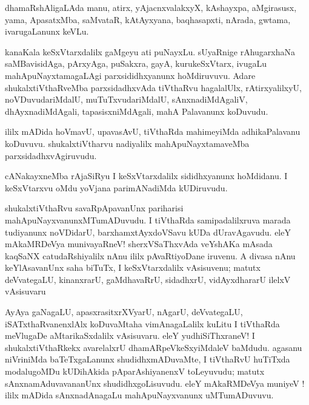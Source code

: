 \documentclass{article}
\begin{document}
\begin{mn}
dhamaRshAligaLAda manu, atirx, yAjacnxvalakxyX, kAshayxpa, aMgirasusx, yama, ApasatxMba, saMvataR,
kAtAyxyana, baqhasapxti, nArada, gwtama, ivarugaLanunx keVLu.
\end{mn}

\begin{mn}
kanaKala keSxVtarxdalilx gaMgeyu ati puNayxLu. sUyaRnige rAhugarxhaNa saMBavisidAga, pArxyAga, 
puSakxra, gayA, kurukeSxVtarx, ivugaLu mahApuNayxtamagaLAgi parxsididhxyanunx hoMdiruvuvu. Adare 
shukalxtiVthaRveMba parxsidadhxvAda tiVthaRvu hagalalUlx, rAtirxyalilxyU, noVDuvudariMdalU, 
muTuTxvudariMdalU, sAnxnadiMdAgaliV, dhAyxnadiMdAgali, tapasisxniMdAgali, mahA Palavanunx koDuvudu.
\end{mn}

\begin{mn}
ililx mADida hoVmavU, upavasAvU, tiVthaRda mahimeyiMda adhikaPalavanu koDuvuvu. shukalxtiVtharvu 
nadiyalilx mahApuNayxtamaveMba parxsidadhxvAgiruvudu.
\end{mn}

\begin{mn}
cANakayxneMba rAjaSiRyu I keSxVtarxdalilx sididhxyanunx hoMdidanu. I keSxVtarxvu oMdu yoVjana 
parimANadiMda kUDiruvudu.
\end{mn}

\begin{mn}
shukalxtiVthaRvu savaRpApavanUnx pariharisi mahApuNayxvanunxMTumADuvudu. I tiVthaRda 
samipadalilxruva marada tudiyanunx noVDidarU, barxhamxtAyxdoVSavu kUDa dUravAgavudu. 
eleY mAkaMRDeVya munivayaRneV! sherxVSaThxvAda veYshAKa mAsada kaqSaNX catudaRshiyalilx nAnu 
ililx pAvaRtiyoDane iruvenu. A divasa nAnu keYlAsavanUnx saha biTuTx, I keSxVtarxdalilx 
vAsisuvenu; matutx deVvategaLU, kinanxrarU, gaMdhavaRrU, sidadhxrU, vidAyxdhararU ilelxV vAsisuvaru
\end{mn}

\begin{mn}
AyAya gaNagaLU, apasxrasitxrXVyarU, nAgarU, deVvategaLU, iSATxthaRvanenxlAlx koDuvaMtaha 
vimAnagaLalilx kuLitu I tiVthaRda meVlugaDe aMtarikaSxdalilx vAsisuvaru. eleY yudhiSiThxraneV! 
I shukalxtiVthaRkekx avarelalxrU dhamARpeVkeSxyiMdaleV baMdudu. agasanu niVriniMda baTeTxgaLanunx 
shudidhxmADuvaMte, I tiVthaRvU huTiTxda modalugoMDu kUDihAkida pAparAshiyanenxV toLeyuvudu; 
matutx sAnxnamAduvavananUnx shudidhxgoLisuvudu. eleY mAkaRMDeVya muniyeV !  ililx mADida 
sAnxnadAnagaLu mahApuNayxvanunx uMTumADuvuvu.
\end{mn}
\end{document}
